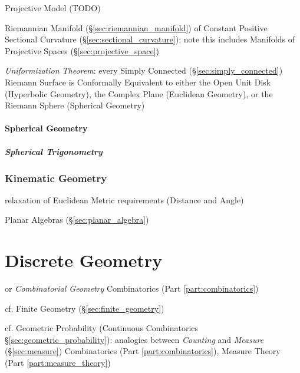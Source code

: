 Projective Model (TODO)

Riemannian Manifold (\S\ref{sec:riemannian_manifold}) of Constant Positive
Sectional Curvature (\S\ref{sec:sectional_curvature}); note this includes
Manifolds of Projective Spaces (\S\ref{sec:projective_space})

\emph{Uniformization Theorem}: every Simply Connected
(\S\ref{sec:simply_connected}) Riemann Surface is Conformally Equivalent to
either the Open Unit Disk (Hyperbolic Geometry), the Complex Plane (Euclidean
Geometry), or the Riemann Sphere (Spherical Geometry)



\paragraph{Spherical Geometry}\label{sec:spherical_geometry}\hfill

\subparagraph{Spherical Trigonometry}\label{sec:spherical_trigonometry}\hfill



\subsubsection{Kinematic Geometry}\label{sec:kinematic_geometry}\hfill

relaxation of Euclidean Metric requirements (Distance and Angle)

Planar Algebras (\S\ref{sec:planar_algebra})




\section{Discrete Geometry}\label{sec:discrete_geometry}

or \emph{Combinatorial Geometry} \fist Combinatorics (Part
\ref{part:combinatorics})

cf. Finite Geometry (\S\ref{sec:finite_geometry})

\fist cf. Geometric Probability (Continuous Combinatorics
\S\ref{sec:geometric_probability}): analogies between \emph{Counting} and
\emph{Measure} (\S\ref{sec:measure}) \fist Combinatorics (Part
\ref{part:combinatorics}), Measure Theory (Part \ref{part:measure_theory})



